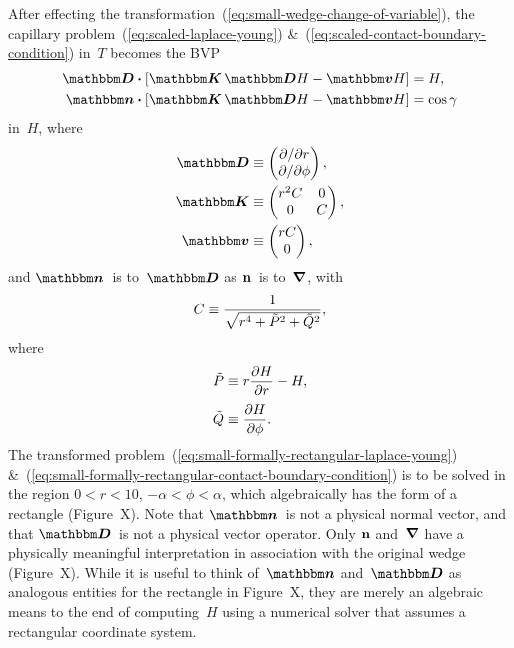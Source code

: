 After effecting the transformation~(\ref{eq:small-wedge-change-of-variable}),
the capillary problem~(\ref{eq:scaled-laplace-young})
\&~(\ref{eq:scaled-contact-boundary-condition}) in~$T$
becomes the BVP
\begin{align}
  \matder \dotp \squarebr[\bulkysize]{\mat{K} \matder H - \mat{v} H}
    &= H,
    \label{eq:small-formally-rectangular-laplace-young} \\
  \mat{n} \dotp \squarebr[\bulkysize]{\mat{K} \matder H - \mat{v} H}
    &= \cos\gamma
    \label{eq:small-formally-rectangular-contact-boundary-condition}
\end{align}
in~$H$, where
\begin{align}
  \matder &\ideq
    \begin{pmatrix}
      \pd / {\pd r} \\
      \pd / {\pd\phi}
    \end{pmatrix},
    \label{eq:small-formally-rectangular-derivative} \\
  \mat{K} &\ideq
    \begin{pmatrix}
      r^2 C & 0 \\
      0 & C
    \end{pmatrix},
    \label{eq:small-formally-rectangular-diffusion-coefficient} \\
  \mat{v} &\ideq
    \begin{pmatrix}
      r C \\
      0
    \end{pmatrix},
    \label{eq:small-formally-rectangular-convection-coefficient}
\end{align}
and $\mat{n}$~is to~$\matder$ as $\mathop{}\!\boldsymbol{\mathbf{n}}$~is to~$\mathop{}\!\boldsymbol{\mathbf{\nabla}}$,
with
\begin{equation}
  C \equiv \frac{1}{\sqrt{r^4 + \tilde{P}^2 + \tilde{Q}^2}},
  \label{eq:small-formally-rectangular-scalar-coefficient}
\end{equation}
where
\begin{align}
  \tilde{P} &\ideq r \pder{H}{r} - H,
    \\[\tallspace]
  \tilde{Q} &\ideq \pder{H}{\phi}.
\end{align}
The transformed problem~(\ref{eq:small-formally-rectangular-laplace-young})
\&~(\ref{eq:small-formally-rectangular-contact-boundary-condition})
is to be solved in the region
$0 < r < 10$, $-\alpha < \phi < \alpha$,
which algebraically has the form of a rectangle
(Figure~X\@). %
Note that $\mat{n}$~is not a physical normal vector,
and that $\matder$~is not a physical vector operator.
Only $\mathop{}\!\boldsymbol{\mathbf{n}}$ and~$\mathop{}\!\boldsymbol{\mathbf{\nabla}}$ have a physically meaningful interpretation
in association with the original wedge
(Figure~X\@). %
While it is useful to think of~$\mat{n}$ and~$\matder$
as analogous entities for the rectangle in
Figure~X\@, %
they are merely an algebraic means to the end of computing~$H$
using a numerical solver that assumes a rectangular coordinate system.


